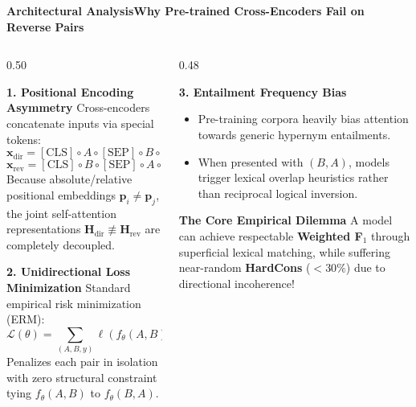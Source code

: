 \documentclass[aspectratio=169,10pt]{beamer}
\begin{document}
\begin{frame}{\textbf{Architectural Analysis}}{\textbf{Why Pre-trained Cross-Encoders Fail on Reverse Pairs}}
  \begin{columns}[T]
    \begin{column}{0.50\textwidth}
      \begin{block}{\textbf{1. Positional Encoding Asymmetry}}
        \small
        Cross-encoders concatenate inputs via special tokens:
        $$\mathbf{x}_{\text{dir}} = [\text{CLS}] \circ A \circ [\text{SEP}] \circ B \circ [\text{SEP}]$$
        $$\mathbf{x}_{\text{rev}} = [\text{CLS}] \circ B \circ [\text{SEP}] \circ A \circ [\text{SEP}]$$
        Because absolute/relative positional embeddings $\mathbf{p}_i \neq \mathbf{p}_j$, the joint self-attention representations $\mathbf{H}_{\text{dir}} \not\equiv \mathbf{H}_{\text{rev}}$ are completely decoupled.
      \end{block}
      \vspace{0.1cm}
      \begin{block}{\textbf{2. Unidirectional Loss Minimization}}
        \small
        Standard empirical risk minimization (ERM):
        $$\mathcal{L}(\theta) = \sum_{(A, B, y)} \ell\left(f_\theta(A, B), y\right)$$
        Penalizes each pair in isolation with zero structural constraint tying $f_\theta(A, B)$ to $f_\theta(B, A)$.
      \end{block}
    \end{column}

    \begin{column}{0.48\textwidth}
      \begin{block}{\textbf{3. Entailment Frequency Bias}}
        \small
        \begin{itemize}
          \item Pre-training corpora heavily bias attention towards generic hypernym entailments.
          \item When presented with $(B, A)$, models trigger lexical overlap heuristics rather than reciprocal logical inversion.
        \end{itemize}
      \end{block}
      \vspace{0.1cm}
      \begin{alertblock}{\textbf{The Core Empirical Dilemma}}
        \small
        A model can achieve respectable \textbf{Weighted F$_1$} through superficial lexical matching, while suffering near-random \textbf{HardCons} ($< 30\%$) due to directional incoherence!
      \end{alertblock}
    \end{column}
  \end{columns}
\end{frame}
\end{document}
